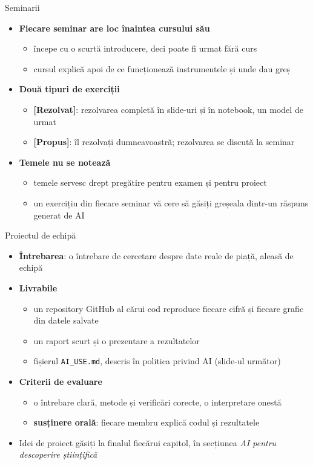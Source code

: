 \begin{frame}{Seminarii}
\itemsize{\small}
\begin{itemize}
    \item \textbf{Fiecare seminar are loc înaintea cursului său}
    \begin{itemize}
        \item începe cu o scurtă introducere, deci poate fi urmat fără curs
        \item cursul explică apoi de ce funcționează instrumentele și unde dau greș
    \end{itemize}
    \item \textbf{Două tipuri de exerciții}
    \begin{itemize}
        \item \textbf{[Rezolvat]}: rezolvarea completă în slide-uri și în notebook, un model de urmat
        \item \textbf{[Propus]}: îl rezolvați dumneavoastră; rezolvarea se discută la seminar
    \end{itemize}
    \item \textbf{Temele nu se notează}
    \begin{itemize}
        \item temele servesc drept pregătire pentru examen și pentru proiect
        \item un exercițiu din fiecare seminar vă cere să găsiți greșeala dintr-un răspuns generat de AI
    \end{itemize}
\end{itemize}
\end{frame}

\begin{frame}{Proiectul de echipă}
\itemsize{\small}
\begin{itemize}
    \item \textbf{Întrebarea}: o întrebare de cercetare despre date reale de piață, aleasă de echipă
    \item \textbf{Livrabile}
    \begin{itemize}
        \item un repository GitHub al cărui cod reproduce fiecare cifră și fiecare grafic din datele salvate
        \item un raport scurt și o prezentare a rezultatelor
        \item fișierul \texttt{AI\_USE.md}, descris în politica privind AI (slide-ul următor)
    \end{itemize}
    \item \textbf{Criterii de evaluare}
    \begin{itemize}
        \item o întrebare clară, metode și verificări corecte, o interpretare onestă
        \item \textbf{susținere orală}: fiecare membru explică codul și rezultatele
    \end{itemize}
    \item Idei de proiect găsiți la finalul fiecărui capitol, în secțiunea \emph{AI pentru descoperire științifică}
\end{itemize}
\end{frame}


